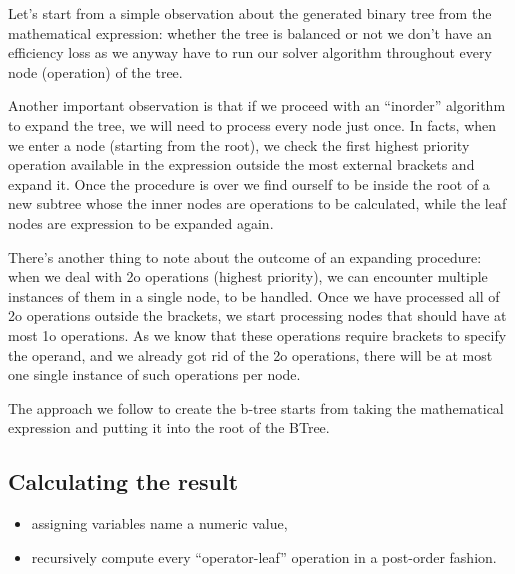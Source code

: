 Let's start from a simple observation about the generated binary tree from the mathematical expression: whether the tree is balanced or not we don't have an efficiency loss as we anyway have to run our solver algorithm throughout every node (operation) of the tree.

Another important observation is that if we proceed with an ``inorder'' algorithm to expand the tree, we will need to process every node just once. In facts, when we enter a node (starting from the root), we check the first highest priority operation available in the expression outside the most external brackets and expand it. Once the procedure is over we find ourself to be inside the root of a new subtree whose the inner nodes are operations to be calculated, while the leaf nodes are expression to be expanded again.
 
There's another thing to note about the outcome of an expanding procedure: when we deal with 2o operations (highest priority), we can encounter multiple instances of them in a single node, to be handled. Once we have processed all of 2o operations outside the brackets, we start processing nodes that should have at most 1o operations. As we know that these operations require brackets to specify the operand, and we already got rid of the 2o operations, there will be at most one single instance of such operations per node.

The approach we follow to create the b-tree starts from taking the mathematical expression and putting it into the root of the BTree.





\subsection{Calculating the result}

\begin{itemize}
 \item assigning variables name a numeric value,
 \item recursively compute every ``operator-leaf'' operation in a post-order fashion.
\end{itemize}

\newpage
